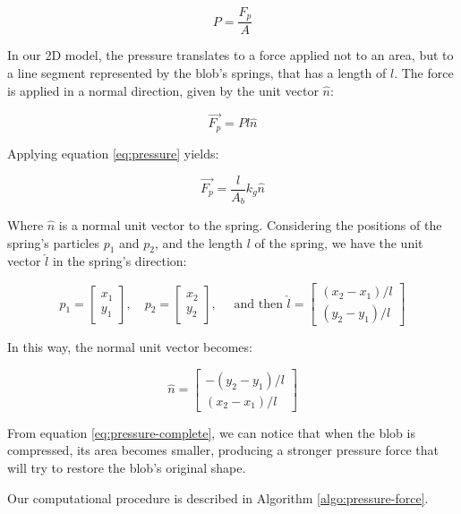 \documentclass[manuscript, screen]{timtm}
\begin{document}
\[P = \frac{F_p}{A} \]

In our 2D model, the pressure translates to a force applied not to an area, but to a line segment represented by the blob's springs, that has a length of $l$. The force is applied in a normal direction, given by the unit vector $\hat{n}$:

\[\vec{F_p} = Pl\hat{n} \]

Applying equation \ref{eq:pressure} yields:

\begin{equation} \label{eq:pressure-complete}
\vec{F_p} = \frac{l}{A_b} k_g \hat{n}
\end{equation}

Where $\hat{n}$ is a normal unit vector to the spring. Considering the positions of the spring's particles $p_1$ and $p_2$, and the length $l$ of the spring, we have the unit vector $\hat{l}$ in the spring's direction:

\[
p_1 = \begin{bmatrix} x_1 \\ y_1 \end{bmatrix}, \quad
p_2 = \begin{bmatrix} x_2 \\ y_2 \end{bmatrix}, \quad
\text{ and then } \hat{l} = \begin{bmatrix} (x_2-x_1)/l \\ (y_2-y_1)/l \end{bmatrix}
\]

In this way, the normal unit vector becomes:

\[
\hat{n} = \begin{bmatrix} -(y_2-y_1)/l \\ (x_2-x_1)/l \end{bmatrix}
\]

From equation \ref{eq:pressure-complete}, we can notice that when the blob is compressed, its area becomes smaller, producing a stronger pressure force that will try to restore the blob's original shape.

Our computational procedure is described in Algorithm \ref{algo:pressure-force}.
\end{document}
